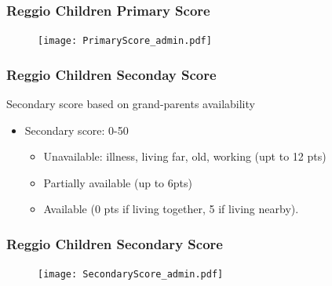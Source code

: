 \documentclass[xcolor=table]{beamer}
\begin{document}
\begin{frame}
\frametitle{Reggio Children Primary Score}
\begin{center}
\begin{figure}
\texttt{[image: PrimaryScore\_admin.pdf]}
\end{figure}
\end{center}
\end{frame}
\begin{frame}
\frametitle{Reggio Children Seconday Score}\label{frame:ReggioScore2}
Secondary score based on grand-parents availability
\begin{itemize}
	\item Secondary score: 0-50
	\begin{itemize}
		\item Unavailable: illness, living far, old, working (upt to 12 pts)
		\item Partially available (up to 6pts)
		\item Available (0 pts if living together, 5 if living nearby).
	\end{itemize}
\end{itemize}
\end{frame}
\begin{frame}
\frametitle{Reggio Children Secondary Score}
\begin{center}
\begin{figure}
\texttt{[image: SecondaryScore\_admin.pdf]}
\end{figure}
\end{center}
\end{frame}
\end{document}
